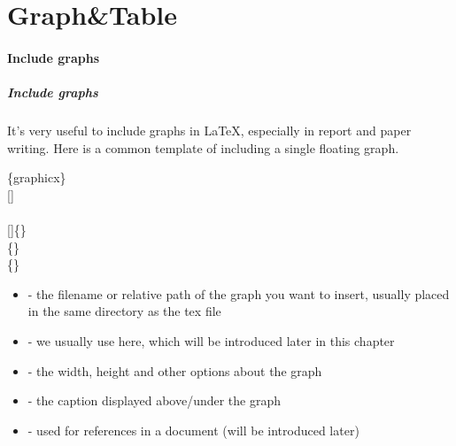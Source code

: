 \part{Graph&Table}
\subsection{Include graphs}

\begin{frame}
	\frametitle{Include graphs}
	\small
	It's very useful to include graphs in \LaTeX, especially in report and paper writing. Here is a common template of including a single floating graph.
	\begin{command}
		\{graphicx\}\\
		[]\\
		\qquad{}\\
		\qquad{}[]\{\}\\
		\qquad{}\{\}\\
		\qquad{}\{\}\\
		\begin{itemize}
			\setlength{\itemsep}{0pt}
			\setlength{\parsep}{0pt}
			\setlength{\parskip}{0pt}
			\item {} - the filename or relative path of the graph you want to insert, usually placed in the same directory as the tex file
			\item {} - we usually use  here, which will be introduced later in this chapter
			\item {} - the width, height and other options about the graph
			\item {} - the caption displayed above/under the graph
			\item {} - used for references in a document (will be introduced later)
		\end{itemize}
	\end{command}
\end{frame}

